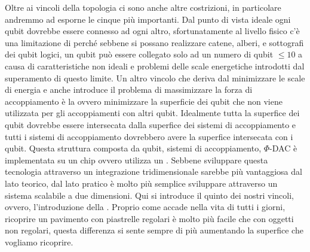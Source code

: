 Oltre ai vincoli della topologia ci sono anche altre costrizioni, in particolare andremmo ad esporne le cinque più importanti. Dal punto di vista ideale ogni qubit dovrebbe essere connesso ad ogni altro, sfortunatamente al livello fisico c'è una limitazione di  perché sebbene si possano realizzare catene, alberi, e sottografi dei qubit logici, un qubit può essere collegato solo ad un numero di qubit $\le 10$ a causa di caratteristiche non ideali e problemi delle scale energetiche introdotti dal superamento di questo limite. Un altro vincolo che deriva dal minimizzare le scale di energia e anche introduce il problema di massimizzare la forza di accoppiamento è la  ovvero minimizzare la superficie dei qubit che non viene utilizzata per gli accoppiamenti con altri qubit. Idealmente tutta la superfice dei qubit dovrebbe essere intersecata dalla superfice dei sistemi di accoppiamento e tutti i sistemi di accoppiamento dovrebbero avere la superfice intersecata con i qubit. Questa struttura composta da qubit, sistemi di accoppiamento, $\Phi$-DAC è implementata su un chip ovvero utilizza un . Sebbene sviluppare questa tecnologia attraverso un integrazione tridimensionale sarebbe più vantaggiosa dal lato teorico, dal lato pratico è molto più semplice sviluppare attraverso un sistema scalabile a due dimensioni. Qui si introduce il quinto dei nostri vincoli, ovvero, l'introduzione della . Proprio come accade nella vita di tutti i giorni, ricoprire un pavimento con piastrelle regolari è molto più facile che con oggetti non regolari, questa differenza si sente sempre di più aumentando la superfice che vogliamo ricoprire.\\
